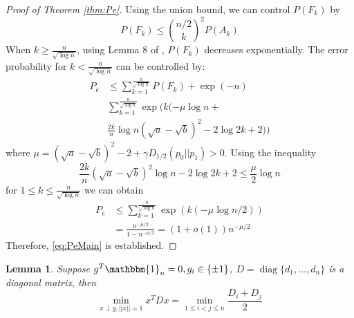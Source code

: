 \documentclass[conference]{IEEEtran}
\newtheorem{lemma}{Lemma}
\DeclareMathOperator{\diag}{diag}
\begin{document}
\begin{proof}[Proof of Theorem \ref{thm:Pe}]
		Using the union bound, we can control $P(F_k)$ by
		$$
		P(F_k) \leq \binom{n/2}{k}^2 P(A_k)
		$$
		When $k \geq \frac{n}{\sqrt{\log n}}$, using Lemma 8 of \cite{feng2021},
		$P(F_k)$ decreases exponentially. The error probability for $k < \frac{n}{\sqrt{\log n}}$
		can be controlled by:
		\begin{align*}
		P_e &\leq \sum_{k=1}^{\frac{n}{\sqrt{\log n}}} P(F_k) + \exp(-n) \\
		& \sum_{k=1}^{\frac{n}{\sqrt{\log n}}} \exp(k(-\mu \log n + \\
		&\frac{2k}{n} \log n(\sqrt{a} - \sqrt{b})^2 - 2\log 2k + 2))
		\end{align*}
		where $\mu = (\sqrt{a} - \sqrt{b})^2-2 + \gamma D_{1/2}(p_0||p_1) > 0$.
		Using the inequality
		$$
		\frac{2k}{n}(\sqrt{a} - \sqrt{b})^2\log n -2\log2k+2\leq \frac{\mu}{2} \log n
		$$
		for $1\leq k \leq \frac{n}{\sqrt{\log n}}$ we can obtain
		\begin{align*}
		P_e &\leq \sum_{k=1}^{\frac{n}{\sqrt{\log n}}} \exp(k(-\mu \log n/2)) \\
		& = \frac{n^{-\mu / 2}}{1-n^{-\mu / 2}} = (1+o(1))n^{-\mu / 2}
		\end{align*}
		Therefore, \eqref{eq:PeMain} is established.
	\end{proof}
\begin{lemma}
	Suppose $g^T \mathbbm{1}_n=0, g_i\in \{\pm 1 \}$, $D=\diag\{d_1, \dots, d_n\}$ is a diagonal matrix,
	then
	\begin{equation}
	\min_{x\perp g, ||x||=1} x^T D x = \min_{1\leq i < j \leq n}\frac{D_i + D_j}{2}
	\end{equation}
\end{lemma}
\end{document}
